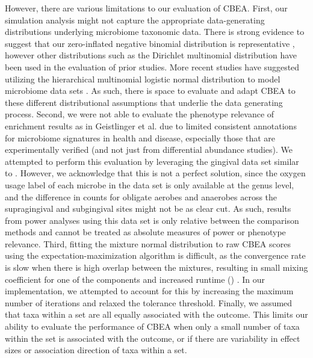 \documentclass[10pt,letterpaper]{article}
\begin{document}
However, there are various limitations to our evaluation of CBEA. First, our simulation analysis might not capture the appropriate data-generating distributions underlying microbiome taxonomic data. There is strong evidence to suggest that our zero-inflated negative binomial distribution is representative \cite{calgaro2020}, however other distributions such as the Dirichlet multinomial distribution \cite{wu2016a} have been used in the evaluation of prior studies. More recent studies have suggested utilizing the hierarchical multinomial logistic normal distribution to model microbiome data sets \cite{morton2021, ma2021a}. As such, there is space to evaluate and adapt CBEA to these different distributional assumptions that underlie the data generating process. Second, we were not able to evaluate the phenotype relevance of enrichment results as in Geistlinger et al. \cite{geistlinger2021} due to limited consistent annotations for microbiome signatures in health and disease, especially those that are experimentally verified (and not just from differential abundance studies). We attempted to perform this evaluation by leveraging the gingival data set similar to \cite{calgaro2020}. However, we acknowledge that this is not a perfect solution, since the oxygen usage label of each microbe in the data set is only available at the genus level, and the difference in counts for obligate aerobes and anaerobes across the supragingival and subgingival sites might not be as clear cut. As such, results from power analyses using this data set is only relative between the comparison methods and cannot be treated as absolute measures of power or phenotype relevance. Third, fitting the mixture normal distribution to raw CBEA scores using the expectation-maximization algorithm is difficult, as the convergence rate is slow when there is high overlap between the mixtures, resulting in small mixing coefficient for one of the components and increased runtime () \cite{naim2012}. In our implementation, we attempted to account for this by increasing the maximum number of iterations and relaxed the tolerance threshold. Finally, we assumed that taxa within a set are all equally associated with the outcome. This limits our ability to evaluate the performance of CBEA when only a small number of taxa within the set is associated with the outcome, or if there are variability in effect sizes or association direction of taxa within a set. 
\end{document}
